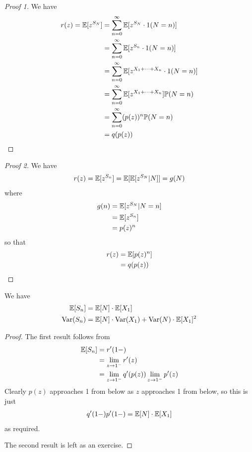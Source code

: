 \documentclass{../../template/note}
\begin{document}
    \begin{proof}[Proof 1]
        We have
        \begin{align*}
            r(z) = \mathbb E[z^{S_N}] &= \sum_{n=0}^\infty \mathbb E[z^{S_N} \cdot 1(N = n)] \\
            &= \sum_{n=0}^\infty \mathbb E[z^{S_n} \cdot 1(N = n)] \\
            &= \sum_{n=0}^\infty \mathbb E[z^{X_1+\dots+X_n} \cdot 1(N = n)] \\
            &= \sum_{n=0}^\infty \mathbb E[z^{X_1+\dots+X_n}] \mathbb P(N = n) \\
            &= \sum_{n=0}^\infty (p(z))^n \mathbb P(N = n) \\
            &= q(p(z))
        \end{align*}
    \end{proof}
    
    \begin{proof}[Proof 2]
        We have
        \begin{align*}
            r(z) = \mathbb E[z^{S_n}] = \mathbb E[\mathbb E[z^{S_N} | N]] = g(N)
        \end{align*}
        where
        \begin{align*}
            g(n) &= \mathbb E[z^{S_N} | N = n] \\
            &= \mathbb E[z^{S_n}] \\
            &= p(z)^n
        \end{align*}
        so that
        \begin{align*}
            r(z) &= \mathbb E[p(z)^n] \\
            &= q(p(z))
        \end{align*}
    \end{proof}
    
    \begin{corollary}
        We have
        \begin{align*}
            \mathbb E[S_n] &= \mathbb E[N] \cdot \mathbb E[X_1] \\
            \operatorname{Var}(S_n) &= \mathbb E[N] \cdot \operatorname{Var}(X_1)+ \operatorname{Var}(N) \cdot \mathbb E[X_1]^2
        \end{align*}
    \end{corollary}
    
    \begin{proof}
        The first result follows from
        \begin{align*}
            \mathbb E[S_n] &= r'(1-) \\
            &= \lim_{z\to 1^-} r'(z) \\
            &= \lim_{z\to 1^-} q'(p(z)) \lim_{z\to 1^-} p'(z) 
        \end{align*}
        Clearly \(p(z)\) approaches 1 from below as \(z\) approaches 1 from below, so this is just
        \begin{align*}
            q'(1-)p'(1-) = \mathbb E[N] \cdot \mathbb E[X_1]
        \end{align*}
        as required.   
        
        The second result is left as an exercise.
    \end{proof}
    
\end{document}
